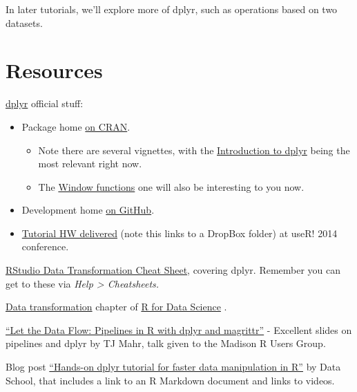 \documentclass[
]{book}
\providecommand{\tightlist}{%
  \setlength{\itemsep}{0pt}\setlength{\parskip}{0pt}}
\begin{document}
In later tutorials, we'll explore more of dplyr, such as operations based on two datasets.

\hypertarget{resources}{%
\section{Resources}\label{resources}}

\href{https://dplyr.tidyverse.org}{dplyr} official stuff:

\begin{itemize}
\tightlist
\item
  Package home \href{https://cloud.r-project.org/package=dplyr}{on CRAN}.

  \begin{itemize}
  \tightlist
  \item
    Note there are several vignettes, with the \href{https://dplyr.tidyverse.org/articles/dplyr.html}{Introduction to dplyr} being the most relevant right now.
  \item
    The \href{https://dplyr.tidyverse.org/articles/window-functions.html}{Window functions} one will also be interesting to you now.
  \end{itemize}
\item
  Development home \href{https://github.com/hadley/dplyr}{on GitHub}.
\item
  \href{https://www.dropbox.com/sh/i8qnluwmuieicxc/AAAgt9tIKoIm7WZKIyK25lh6a}{Tutorial HW delivered} (note this links to a DropBox folder) at useR! 2014 conference.
\end{itemize}

\href{https://github.com/rstudio/cheatsheets/raw/master/data-transformation.pdf}{RStudio Data Transformation Cheat Sheet}, covering dplyr. Remember you can get to these via \emph{Help \textgreater{} Cheatsheets.}

\href{https://r4ds.had.co.nz/transform.html}{Data transformation} chapter of \href{https://r4ds.had.co.nz}{R for Data Science} \citep{wickham2016}.

\href{https://github.com/tjmahr/MadR_Pipelines}{``Let the Data Flow: Pipelines in R with dplyr and magrittr''} - Excellent slides on pipelines and dplyr by TJ Mahr, talk given to the Madison R Users Group.

Blog post \href{https://www.dataschool.io/dplyr-tutorial-for-faster-data-manipulation-in-r/}{``Hands-on dplyr tutorial for faster data manipulation in R''} by Data School, that includes a link to an R Markdown document and links to videos.
\end{document}
